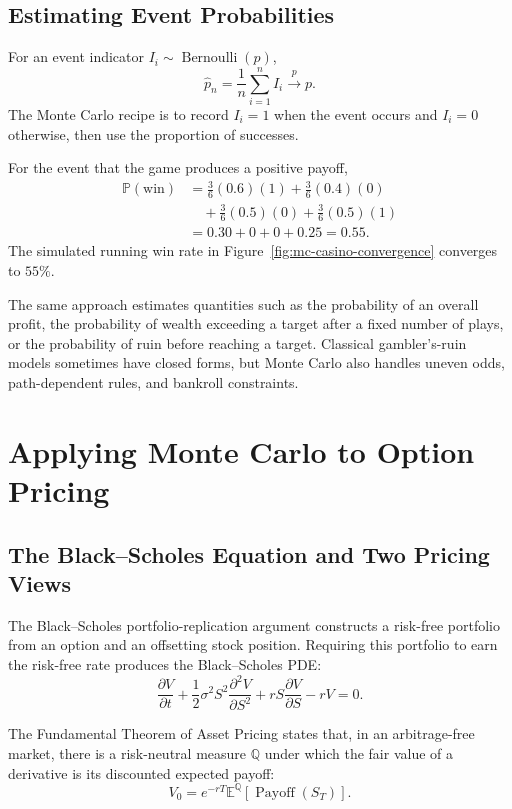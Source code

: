 \documentclass[12pt,openany]{book}
\theoremstyle{definition}
\theoremstyle{remark}
\newcommand{\E}{\mathbb{E}}
\newcommand{\Prob}{\mathbb{P}}
\begin{document}
\subsection{Estimating Event Probabilities}

For an event indicator \(I_i\sim\operatorname{Bernoulli}(p)\),
\[
\widehat p_n
=\frac1n\sum_{i=1}^{n}I_i
\xrightarrow{p}p.
\]
The Monte Carlo recipe is to record \(I_i=1\) when the event occurs and
\(I_i=0\) otherwise, then use the proportion of successes.

For the event that the game produces a positive payoff,
\[
\begin{aligned}
\Prob(\text{win})
&=\frac36(0.6)(1)+\frac36(0.4)(0)\\
&\quad+\frac36(0.5)(0)+\frac36(0.5)(1)\\
&=0.30+0+0+0.25=0.55.
\end{aligned}
\]
The simulated running win rate in Figure~\ref{fig:mc-casino-convergence}
converges to \(55\%\).

The same approach estimates quantities such as the probability of an
overall profit, the probability of wealth exceeding a target after a fixed
number of plays, or the probability of ruin before reaching a target.
Classical gambler's-ruin models sometimes have closed forms, but Monte Carlo
also handles uneven odds, path-dependent rules, and bankroll constraints.

\section{Applying Monte Carlo to Option Pricing}

\subsection{The Black--Scholes Equation and Two Pricing Views}

The Black--Scholes portfolio-replication argument constructs a risk-free
portfolio from an option and an offsetting stock position. Requiring this
portfolio to earn the risk-free rate produces the Black--Scholes PDE:
\[
\frac{\partial V}{\partial t}
+\frac12\sigma^2S^2\frac{\partial^2V}{\partial S^2}
+rS\frac{\partial V}{\partial S}
-rV=0.
\]

The Fundamental Theorem of Asset Pricing states that, in an arbitrage-free
market, there is a risk-neutral measure \(\mathbb{Q}\) under which the fair
value of a derivative is its discounted expected payoff:
\[
V_0=e^{-rT}\E^{\mathbb{Q}}[\operatorname{Payoff}(S_T)].
\]
\end{document}
